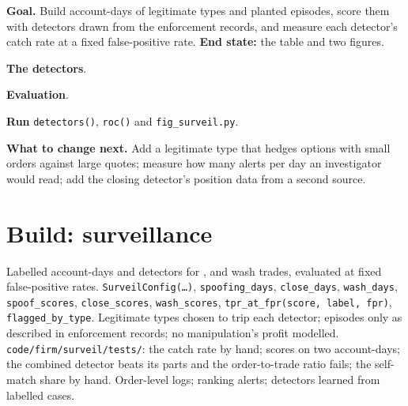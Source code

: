 \begin{tutorial}
\textbf{Goal.} Build account-days of legitimate types and planted episodes, score them with detectors drawn from the enforcement records, and measure
each detector's catch rate at a fixed false-positive rate. \textbf{End state:} the table and two figures.
\begin{tutsteps}
\item \textbf{The  detectors}.
\label{lst:s2:manipulative-strategies-and-how-they-are-caught:detect}
\item \textbf{Evaluation}.
\label{lst:s2:manipulative-strategies-and-how-they-are-caught:eval}
\item \textbf{Run} \texttt{detectors()}, \texttt{roc()} and \texttt{fig\_surveil.py}.
\end{tutsteps}
\textbf{What to change next.} Add a legitimate type that hedges options with small orders against large quotes; measure how many alerts per day an
investigator would read; add the closing detector's position data from a second source.
\end{tutorial}

\section{Build: surveillance}\label{bld:s2:manipulative-strategies-and-how-they-are-caught:surveil}

\begin{build}
 Labelled account-days and detectors for ,  and wash trades, evaluated at fixed false-positive rates.
 \texttt{SurveilConfig(\dots)}, \texttt{spoofing\_days}, \texttt{close\_days}, \texttt{wash\_days}, \texttt{spoof\_scores},
\texttt{close\_scores}, \texttt{wash\_scores}, \texttt{tpr\_at\_fpr(score, label, fpr)}, \texttt{flagged\_by\_type}.
 Legitimate types chosen to trip each detector; episodes only as described in enforcement records; no manipulation's profit modelled.
 \texttt{code/firm/surveil/tests/}: the catch rate by hand; scores on two account-days; the combined detector beats its parts
and the order-to-trade ratio fails; the self-match share by hand.
 Order-level logs; ranking alerts; detectors learned from labelled cases.
\end{build}

